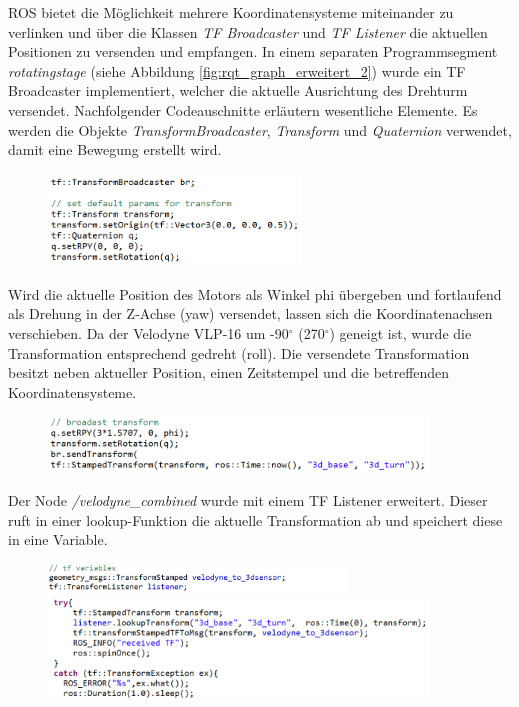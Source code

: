 ROS bietet die Möglichkeit mehrere Koordinatensysteme miteinander zu verlinken und über die Klassen \textit{TF Broadcaster} und \textit{TF Listener} die aktuellen Positionen zu versenden und empfangen. In einem separaten Programmsegment \textit{rotatingstage} (siehe Abbildung \ref{fig:rqt_graph_erweitert_2}) wurde ein TF Broadcaster implementiert, welcher die aktuelle Ausrichtung des Drehturm versendet. Nachfolgender Codeauschnitte erläutern wesentliche Elemente. Es werden die Objekte \textit{TransformBroadcaster}, \textit{Transform} und \textit{Quaternion} verwendet, damit eine Bewegung erstellt wird.
\begin{figure}[H]
	\includegraphics[width=0.6\textwidth]{resources/sourcecode/tf_broadcaster.png}	
\end{figure} 
Wird die aktuelle Position des Motors als Winkel phi übergeben und fortlaufend als Drehung in der Z-Achse (yaw) versendet, lassen sich die Koordinatenachsen verschieben. Da der Velodyne VLP-16 um -90$^\circ$ (270$^\circ$) geneigt ist, wurde die Transformation entsprechend gedreht (roll). Die versendete Transformation besitzt neben aktueller Position, einen Zeitstempel und die betreffenden Koordinatensysteme.
\begin{figure}[H]
	\includegraphics[width=0.9\textwidth]{resources/sourcecode/setrotation.png}	
\end{figure}
Der Node \textit{/velodyne\_combined} wurde mit einem TF Listener erweitert. Dieser ruft in einer lookup-Funktion die aktuelle Transformation ab und speichert diese in eine Variable.
\begin{figure}[H]
	\includegraphics[width=0.7\textwidth]{resources/sourcecode/tf_listener.png}
	\includegraphics[width=0.9\textwidth]{resources/sourcecode/tf_update.png}		

\end{figure}
